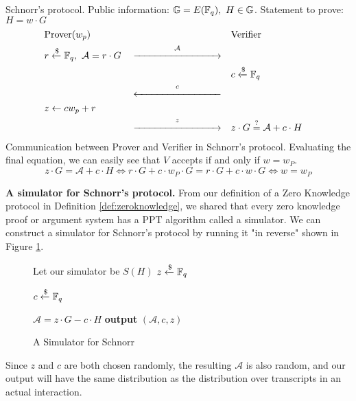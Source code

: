 \begin{protocol}[label={prot:schnorr}]{Schnorr's protocol. Public information: $\mathbb{G} = E(\mathbb{F}_q),\ H \in \mathbb{G}$. Statement to prove: $H = w \cdot G$} 
    \vspace{-0.5cm}
    \begin{align*}
        &\text{Prover}(w_p)& 
        &&
        &\text{Verifier}& 
        \\
        &r \samplefrom \F_q,\ \mathcal A = r \cdot G&
        &\overset  {\mathcal A} {\xrightarrow{\hspace{3cm}}}&
        && 
        \\
        &&
        &&
        &c \samplefrom \F_q&
        \\
        &&
        &\overset c {\xleftarrow{\hspace{3cm}}}&
        &&
        \\
        &z \leftarrow cw_p + r&
        &&
        && 
        \\
        &&
        &\overset {z} {\xrightarrow{\hspace{3cm}}}&
        &z \cdot G \verify \mathcal A + c \cdot H&
    \end{align*}
    \tcblower
    Communication between Prover and Verifier in Schnorr's protocol. Evaluating the final equation, we can easily see that $V$ accepts if and only if $w = w_P$.
    \[
    z \cdot G = \mathcal A + c \cdot H \iff
    r \cdot G + c \cdot w_P \cdot G  = r \cdot G + c \cdot w \cdot G \iff
    w  =  w_P
    \]
\end{protocol}



\textbf{A simulator for Schnorr's protocol.} From our definition of a Zero Knowledge protocol in Definition \ref{def:zeroknowledge}, we shared that every zero knowledge proof or argument system has a PPT algorithm called a simulator. We can construct a simulator for Schnorr's protocol by running it "in reverse" shown in Figure \ref{fig:schnorr-sim}.

\begin{figure}[h]
    \centering
    \begin{problem}[width=\linewidth/2]{Let our simulator be $S(H)$}
        $z \xleftarrow{\$} \mathbb{F}_q$ 
        
        $c \xleftarrow{\$} \mathbb{F}_q$
        
        $\mathcal A = z \cdot G - c \cdot H$
        \tcblower
        \textbf{output} $(\mathcal A,c,z)$
    \end{problem}
    \caption{A Simulator for Schnorr}
    \label{fig:schnorr-sim}
\end{figure}

Since $z$ and $c$ are both chosen randomly, the resulting $\mathcal A$ is also random, and our output will have the same distribution as the distribution over transcripts in an actual interaction.

